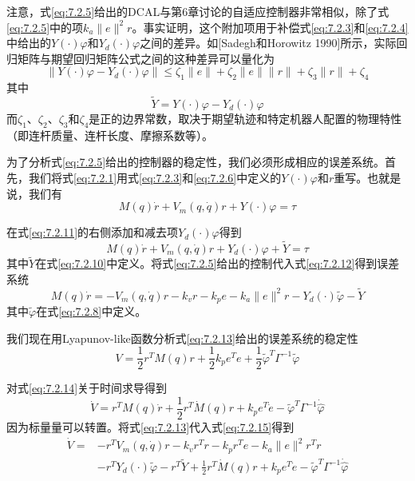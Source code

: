 \documentclass[UTF8]{ctexart}
\begin{document}
注意，式\eqref{eq:7.2.5}给出的DCAL与第6章讨论的自适应控制器非常相似，除了式\eqref{eq:7.2.5}中的项$k_a\|e\|^2r$。事实证明，这个附加项用于补偿式\eqref{eq:7.2.3}和\eqref{eq:7.2.4}中给出的$Y(\cdot)\varphi$和$Y_d(\cdot)\varphi$之间的差异。如[Sadegh和Horowitz 1990]所示，实际回归矩阵与期望回归矩阵公式之间的这种差异可以量化为
\begin{equation}\label{eq:7.2.9}
\|Y(\cdot)\varphi - Y_d(\cdot)\varphi\| \leq \zeta_1\|e\| + \zeta_2\|e\|\|r\| + \zeta_3\|r\| + \zeta_4
\end{equation}
其中
\begin{equation}\label{eq:7.2.10}
\tilde{Y} = Y(\cdot)\varphi - Y_d(\cdot)\varphi
\end{equation}
而$\zeta_1$、$\zeta_2$、$\zeta_3$和$\zeta_4$是正的边界常数，取决于期望轨迹和特定机器人配置的物理特性（即连杆质量、连杆长度、摩擦系数等）。

为了分析式\eqref{eq:7.2.5}给出的控制器的稳定性，我们必须形成相应的误差系统。首先，我们将式\eqref{eq:7.2.1}用式\eqref{eq:7.2.3}和\eqref{eq:7.2.6}中定义的$Y(\cdot)\varphi$和$r$重写。也就是说，我们有
\begin{equation}\label{eq:7.2.11}
M(q)\dot{r} + V_m(q,\dot{q})r + Y(\cdot)\varphi = \tau
\end{equation}

在式\eqref{eq:7.2.11}的右侧添加和减去项$Y_d(\cdot)\varphi$得到
\begin{equation}\label{eq:7.2.12}
M(q)\dot{r} + V_m(q,\dot{q})r + Y_d(\cdot)\varphi + \tilde{Y} = \tau
\end{equation}
其中$\tilde{Y}$在式\eqref{eq:7.2.10}中定义。将式\eqref{eq:7.2.5}给出的控制代入式\eqref{eq:7.2.12}得到误差系统
\begin{equation}\label{eq:7.2.13}
M(q)\dot{r} = -V_m(q,\dot{q})r - k_v r - k_p e - k_a\|e\|^2r - Y_d(\cdot)\tilde{\varphi} - \tilde{Y}
\end{equation}
其中$\tilde{\varphi}$在式\eqref{eq:7.2.8}中定义。

我们现在用Lyapunov-like函数分析式\eqref{eq:7.2.13}给出的误差系统的稳定性
\begin{equation}\label{eq:7.2.14}
V = \frac{1}{2}r^T M(q) r + \frac{1}{2}k_p e^T e + \frac{1}{2}\tilde{\varphi}^T \Gamma^{-1} \tilde{\varphi}
\end{equation}

对式\eqref{eq:7.2.14}关于时间求导得到
\begin{equation}\label{eq:7.2.15}
\dot{V} = r^T M(q)\dot{r} + \frac{1}{2}r^T\dot{M}(q)r + k_p e^T\dot{e} - \tilde{\varphi}^T \Gamma^{-1}\dot{\hat{\varphi}}
\end{equation}
因为标量量可以转置。将式\eqref{eq:7.2.13}代入式\eqref{eq:7.2.15}得到
\begin{equation}\label{eq:7.2.16}
\begin{aligned}
\dot{V} = & -r^T V_m(q,\dot{q})r - k_v r^T r - k_p r^T e - k_a\|e\|^2r^T r \\
& - r^T Y_d(\cdot)\tilde{\varphi} - r^T\tilde{Y} + \frac{1}{2}r^T\dot{M}(q)r + k_p e^T\dot{e} - \tilde{\varphi}^T \Gamma^{-1}\dot{\hat{\varphi}}
\end{aligned}
\end{equation}
\end{document}

